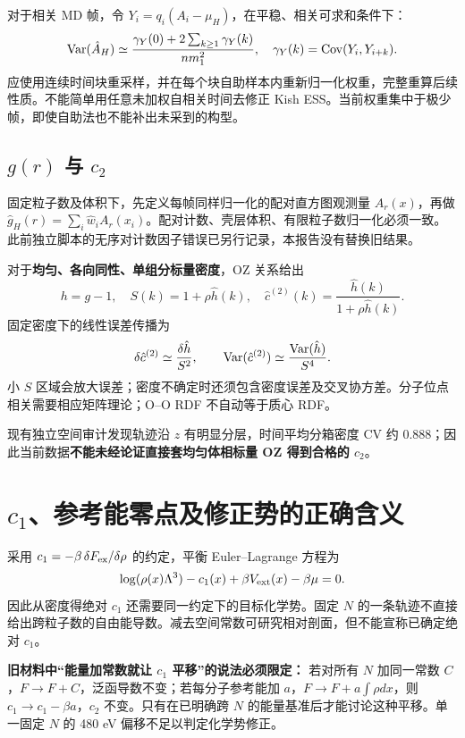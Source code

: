 \documentclass[11pt,a4paper]{article}
\begin{document}
对于相关 MD 帧，令 $Y_i=q_i(A_i-\mu_H)$，在平稳、相关可求和条件下：
\begin{equation}
\operatorname{Var}(\hat A_H)\simeq
\frac{\gamma_Y(0)+2\sum_{k\ge1}\gamma_Y(k)}{nm_1^2},
\quad \gamma_Y(k)=\operatorname{Cov}(Y_i,Y_{i+k}).
\end{equation}
应使用连续时间块重采样，并在每个块自助样本内重新归一化权重，完整重算后续性质。不能简单用任意未加权自相关时间去修正 Kish ESS。当前权重集中于极少帧，即使自助法也不能补出未采到的构型。

\subsection{$g(r)$ 与 $c_2$}
固定粒子数及体积下，先定义每帧同样归一化的配对直方图观测量 $A_r(x)$，再做 $\hat g_H(r)=\sum_i\hat w_i A_r(x_i)$。配对计数、壳层体积、有限粒子数归一化必须一致。此前独立脚本的无序对计数因子错误已另行记录，本报告没有替换旧结果。

对于\textbf{均匀、各向同性、单组分标量密度}，OZ 关系给出
\begin{equation}
h=g-1,\quad S(k)=1+\rho\hat h(k),\quad
\hat c^{(2)}(k)=\frac{\hat h(k)}{1+\rho\hat h(k)}.
\end{equation}
固定密度下的线性误差传播为
\begin{equation}
\delta\hat c^{(2)}\simeq\frac{\delta\hat h}{S^2},\qquad
\operatorname{Var}(\hat c^{(2)})\simeq\frac{\operatorname{Var}(\hat h)}{S^4}.
\end{equation}
小 $S$ 区域会放大误差；密度不确定时还须包含密度误差及交叉协方差。分子位点相关需要相应矩阵理论；O--O RDF 不自动等于质心 RDF。

现有独立空间审计发现轨迹沿 $z$ 有明显分层，时间平均分箱密度 CV 约 0.888；因此当前数据\textbf{不能未经论证直接套均匀体相标量 OZ 得到合格的 $c_2$}。
\newpage
\section{$c_1$、参考能零点及修正势的正确含义}
采用 $c_1=-\beta\,\delta F_{\rm ex}/\delta\rho$ 的约定，平衡 Euler--Lagrange 方程为
\begin{equation}
\log(\rho(x)\Lambda^3)-c_1(x)+\beta V_{\rm ext}(x)-\beta\mu=0.
\end{equation}
因此从密度得绝对 $c_1$ 还需要同一约定下的目标化学势。固定 $N$ 的一条轨迹不直接给出跨粒子数的自由能导数。减去空间常数可研究相对剖面，但不能宣称已确定绝对 $c_1$。

\textbf{旧材料中“能量加常数就让 $c_1$ 平移”的说法必须限定：}
若对所有 $N$ 加同一常数 $C$，$F\to F+C$，泛函导数不变；若每分子参考能加 $a$，$F\to F+a\int\rho dx$，则 $c_1\to c_1-\beta a$，$c_2$ 不变。只有在已明确跨 $N$ 的能量基准后才能讨论这种平移。单一固定 $N$ 的 480 eV 偏移不足以判定化学势修正。
\end{document}
